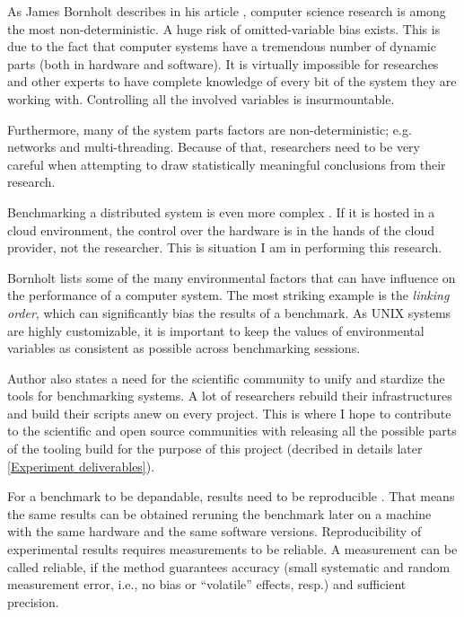 \documentclass{uvamscse}
\begin{document}
As James Bornholt describes in his article \cite{BornBen}, computer science research is among the most non-deterministic. A huge risk of omitted-variable bias exists. This is due to the fact that computer systems have a tremendous number of dynamic parts (both in hardware and software). It is virtually impossible for researches and other experts to have complete knowledge of every bit of the system they are working with. Controlling all the involved variables is insurmountable.

Furthermore, many of the system parts factors are non-deterministic; e.g. networks and multi-threading. Because of that, researchers need to be very careful when attempting to draw statistically meaningful conclusions from their research.

Benchmarking a distributed system is even more complex \cite{BornBen}. If it is hosted in a cloud environment, the control over the hardware is in the hands of the cloud provider, not the researcher. This is situation I am in performing this research.

Bornholt \cite{BornBen} lists some of the many environmental factors that can have influence on the performance of a computer system. The most striking example is the \textit{linking order}, which can significantly bias the results of a benchmark. As UNIX systems are highly customizable, it is important to keep the values of environmental variables as consistent as possible across benchmarking sessions.

Author also states a need for the scientific community to unify and stardize the tools for benchmarking systems. A lot of researchers rebuild their infrastructures and build their scripts anew on every project. This is where I hope to contribute to the scientific and open source communities with releasing all the possible parts of the tooling build for the purpose of this project (decribed in details later \ref{Experiment deliverables}).

For a benchmark to be depandable, results need to be reproducible \cite{BornBen}. That means the same results can be obtained reruning the benchmark later on a machine with the same hardware and the same software versions. Reproducibility of experimental results requires measurements to be reliable. A measurement can be called reliable, if the method guarantees accuracy (small systematic and random measurement error, i.e., no bias or “volatile” effects, resp.) and sufficient precision.
\end{document}
